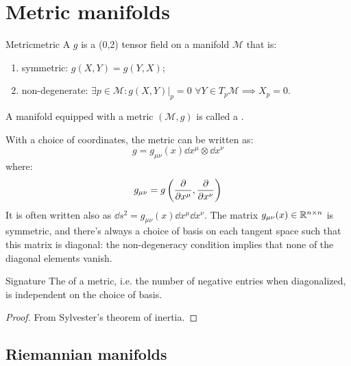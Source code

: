 
\section{Metric manifolds}

\begin{definition}{Metric}{metric}
  A  $ g $ is a (0,2) tensor field on a manifold $ \mathcal{M} $ that is:
  \begin{enumerate}
    \item symmetric: $ g(X,Y) = g(Y,X) $;
    \item non-degenerate: $ \exists p \in \mathcal{M} : g(X,Y)\vert_p = 0 \,\,\forall Y \in T_p \mathcal{M} \implies X_p = 0 $.
  \end{enumerate}
  A manifold equipped with a metric $ (\mathcal{M} , g) $ is called a .
\end{definition}

With a choice of coordinates, the metric can be written as:
\begin{equation}
  g = g_{\mu \nu}(x) \dd x^{\mu} \otimes \dd x^{\nu}
\end{equation}
where:
\begin{equation}
  g_{\mu \nu} = g\left( \frac{\partial}{\partial x^{\mu}}, \frac{\partial}{\partial x^{\nu}} \right)
\end{equation}
It is often written also as $ \dd s^2 = g_{\mu \nu}(x) \dd x^{\mu} \dd x^{\nu} $. The matrix $ g_{\mu \nu}(x) \in \mathbb{R}^{n \times n} $ is symmetric, and there's always a choice of basis on each tangent space such that this matrix is diagonal: the non-degeneracy condition implies that none of the diagonal elements vanish.

\begin{proposition}{Signature}{}
  The  of a metric, i.e. the number of negative entries when diagonalized, is independent on the choice of basis.
\end{proposition}

\begin{proofbox}
  \begin{proof}
    From Sylvester's theorem of inertia.
  \end{proof}
\end{proofbox}

\subsection{Riemannian manifolds}


